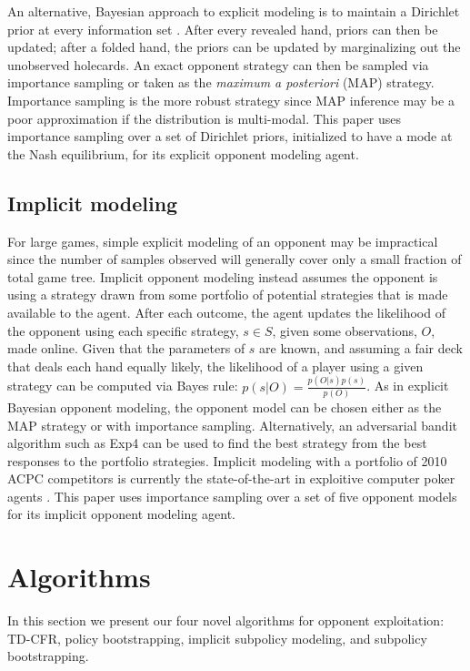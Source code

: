 \documentclass{aamas2013}
\begin{document}
    An alternative, Bayesian approach to explicit modeling is to maintain a Dirichlet prior at every information set \cite{bayesbluff,shortterm}. After every revealed hand, priors can then be updated; after a folded hand, the priors can be updated by marginalizing out the unobserved holecards. An exact opponent strategy can then be sampled via importance sampling or taken as the \textit{maximum a posteriori} (MAP) strategy. Importance sampling is the more robust strategy since MAP inference may be a poor approximation if the distribution is multi-modal. This paper uses importance sampling over a set of Dirichlet priors, initialized to have a mode at the Nash equilibrium, for its explicit opponent modeling agent.
    
    \subsection{Implicit modeling}
    For large games, simple explicit modeling of an opponent may be impractical since the number of samples observed will generally cover only a small fraction of total game tree. Implicit opponent modeling \cite{shortterm} instead assumes the opponent is using a strategy drawn from some portfolio of potential strategies that is made available to the agent. After each outcome, the agent updates the likelihood of the opponent using each specific strategy, $s \in S$, given some observations, $O$, made online. Given that the parameters of $s$ are known, and assuming a fair deck that deals each hand equally likely, the likelihood of a player using a given strategy can be computed via Bayes rule: $p(s | O) = \frac{p(O | s)p(s)}{p(O)}$. As in explicit Bayesian opponent modeling, the opponent model can be chosen either as the MAP strategy or with importance sampling. Alternatively, an adversarial bandit algorithm such as Exp4 \cite{exp4} can be used to find the best strategy from the best responses to the portfolio strategies. Implicit modeling with a portfolio of 2010 ACPC competitors is currently the state-of-the-art in exploitive computer poker agents \cite{implicit}. This paper uses importance sampling over a set of five opponent models for its implicit opponent modeling agent.

\section{Algorithms}
In this section we present our four novel algorithms for opponent exploitation: TD-CFR, policy bootstrapping, implicit subpolicy modeling, and subpolicy bootstrapping.
\end{document}
